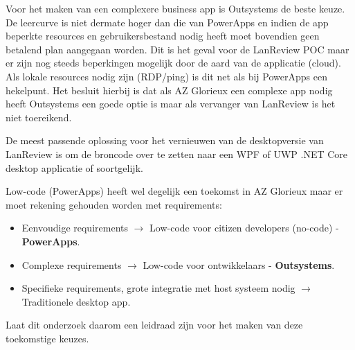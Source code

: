 Voor het maken van een complexere business app is Outsystems de beste keuze. De leercurve is niet dermate hoger dan die van PowerApps en indien de app beperkte resources en gebruikersbestand nodig heeft moet bovendien geen betalend plan aangegaan worden. Dit is het geval voor de LanReview POC maar er zijn nog steeds beperkingen mogelijk door de aard van de applicatie (cloud). Als lokale resources nodig zijn (RDP/ping) is dit net als bij PowerApps een hekelpunt. Het besluit hierbij is dat als AZ Glorieux een complexe app nodig heeft Outsystems een goede optie is maar als vervanger van LanReview is het niet toereikend.

De meest passende oplossing voor het vernieuwen van de desktopversie van LanReview is om de broncode over te zetten naar een WPF of UWP .NET Core desktop applicatie of soortgelijk. 

Low-code (PowerApps) heeft wel degelijk een toekomst in AZ Glorieux maar er moet rekening gehouden worden met requirements:
\begin{itemize}
    \item Eenvoudige requirements $\rightarrow$ Low-code voor citizen developers (no-code) - \textbf{PowerApps}.
    \item Complexe requirements $\rightarrow$ Low-code voor ontwikkelaars - \textbf{Outsystems}.
    \item Specifieke requirements, grote integratie met host systeem nodig $\rightarrow$ Traditionele desktop app.
\end{itemize}

Laat dit onderzoek daarom een leidraad zijn voor het maken van deze toekomstige keuzes.
